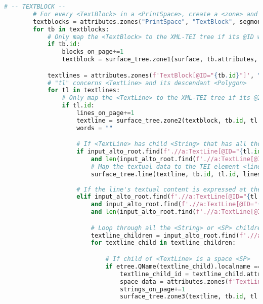 \documentclass[class=article, crop=false]{standalone}
\begin{document}
\begin{lstlisting}[language=python, style=python]
        # -- TEXTBLOCK --
        # For every <TextBlock> in a <PrintSpace>, create a <zone> and assign it attributes.
        textblocks = attributes.zones("PrintSpace", "TextBlock", segmonto_zones)
        for tb in textblocks:
            # Only map the <TextBlock> to the XML-TEI tree if its @ID was found.
            if tb.id:
                blocks_on_page+=1
                textblock = surface_tree.zone1(surface, tb.attributes, tb.id, blocks_on_page)

            textlines = attributes.zones(f'TextBlock[@ID="{tb.id}"]', "TextLine", segmonto_lines)
            # "tl" concerns <TextLine> and its descendant <Polygon>
            for tl in textlines:
                # Only map the <TextLine> to the XML-TEI tree if its @ID was found.
                if tl.id:
                    lines_on_page+=1
                    textline = surface_tree.zone2(textblock, tb.id, tl.attributes, tl.id, lines_on_page)
                    words = ""

                    # If <TextLine> has child <String> that has all the line's textual content, map that to the TEI element <line>.
                    if input_alto_root.find(f'.//a:TextLine[@ID="{tl.id}"]/a:String', namespaces=NS).get("CONTENT") is not None\
                        and len(input_alto_root.find(f'.//a:TextLine[@ID="{tl.id}"]/a:String', namespaces=NS).getchildren()) == 0:
                        # Map the textual data to the TEI element <line>.
                        surface_tree.line(textline, tb.id, tl.id, lines_on_page, None)
                    
                    # If the line's textual content is expressed at the level of glyphs, map that textual data to TEI element <c>.
                    elif input_alto_root.find(f'.//a:TextLine[@ID="{tl.id}"]/a:String', namespaces=NS).get("CONTENT") is not None\
                        and input_alto_root.find(f'.//a:TextLine[@ID="{tl.id}"]/a:String', namespaces=NS).get("CONTENT") != ""\
                        and len(input_alto_root.find(f'.//a:TextLine[@ID="{tl.id}"]/a:String', namespaces=NS).getchildren()) > 0:

                        # Loop through all the <String> or <SP> children of a <TextLine>
                        textline_children = input_alto_root.find(f'.//a:TextLine[@ID="{tl.id}"]', namespaces=NS).getchildren()
                        for textline_child in textline_children:

                            # If child of <TextLine> is a space <SP>
                            if etree.QName(textline_child).localname == "SP":
                                textline_child_id = textline_child.attrib["ID"]
                                space_data = attributes.zones(f'TextLine[@ID="{tl.id}"]', f'SP[@ID="{textline_child_id}"]', None)[0]
                                strings_on_page+=1
                                surface_tree.zone3(textline, tb.id, tl.id, space_data.attributes, space_data.id, strings_on_page)


\end{lstlisting}
\end{document}
